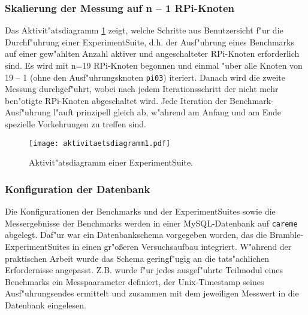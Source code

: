 \subsubsection{Skalierung der Messung auf n -- 1 RPi-Knoten} 

Das Aktivit"atsdiagramm \ref{fig:Aktivitaetsdiagramm} zeigt, welche Schritte aus Benutzersicht f"ur die Durchf"uhr\-ung einer ExperimentSuite, d.h. der Ausf"uhrung eines Benchmarks auf einer gew"ahlten Anzahl aktiver und angeschalteter RPi-Knoten erforderlich sind. Es wird mit n=19 RPi-Knoten begonnen und einmal "uber alle Knoten von 19 -- 1 (ohne den Ausf"uhrungsknoten \texttt{pi03}) iteriert. Danach wird die zweite Messung durchgef"uhrt, wobei nach jedem Iterationsschritt der nicht mehr ben"otigte RPi-Knoten abgeschaltet wird. Jede Iteration der Benchmark-Ausf"uhrung l"auft prinzipell gleich ab, w"ahrend am Anfang und am Ende spezielle Vorkehrungen zu treffen sind. 
\begin{figure}[htb]
  \centerline{\texttt{[image: aktivitaetsdiagramm1.pdf]}} 
  \caption{Aktivit"atsdiagramm einer ExperimentSuite.}
  \label{fig:Aktivitaetsdiagramm}
\end{figure}

\subsubsection{Konfiguration der Datenbank}

Die Konfigurationen der Benchmarks und der ExperimentSuites sowie die Messergebnisse der Benchmarks werden in einer MySQL-Datenbank auf \texttt{careme} abgelegt. Daf"ur war ein Datenbankschema vorgegeben worden, das die Bramble-ExperimentSuites in einen gr"o\ss eren Versuchsaufbau integriert. W"ahrend der praktischen Arbeit wurde das Schema geringf"ugig an die tats"achlichen Erfordernisse angepasst. Z.B. wurde f"ur jedes ausgef"uhrte Teilmodul eines Benchmarks ein Messpaarameter definiert, der Unix-Timestamp seines Ausf"uhrungsendes ermittelt und zusammen mit dem jeweiligen Messwert in die Datenbank eingelesen.


